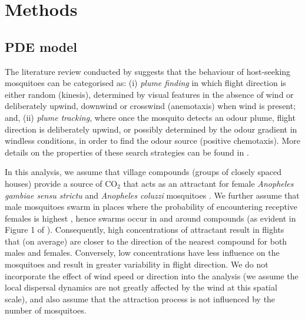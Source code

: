 \documentclass[]{bmcart}
\begin{document}
\section{Methods}

\subsection{PDE model}

The literature review conducted by \cite{Cummins2012} suggests that the behaviour of host-seeking mosquitoes can be categorised as: (i) \emph{plume finding} in which flight direction is either random (kinesis), determined by visual features in the absence of wind or deliberately upwind, downwind or crosswind (anemotaxis) when wind is present; and, (ii) \emph{plume tracking}, where once the mosquito detects an odour plume, flight direction is deliberately upwind, or possibly determined by the odour gradient in windless conditions, in order to find the odour source (positive chemotaxis). More details on the properties of these search strategies can be found in \cite{Pasternak2009}. 

In this analysis, we assume that village compounds (groups of closely spaced houses) provide a source of CO$_2$ that acts as an attractant for female \emph{Anopheles gambiae sensu strictu} and \emph{Anopheles coluzzi} mosquitoes \cite{DeJong1995, Majeed2017}. We further assume that male mosquitoes swarm in places where the probability of encountering receptive females is highest \citep{Diabate2015}, hence swarms occur in and around compounds (as evident in Figure 1 of \citep[][]{Epopa2017}). Consequently, high concentrations of attractant result in flights that (on average) are closer to the direction of the nearest compound for both males and females. Conversely, low concentrations have less influence on the mosquitoes and result in greater variability in flight direction. We do not incorporate the effect of wind speed or direction into the analysis (we assume the local dispersal dynamics are not greatly affected by the wind at this spatial scale), and also assume that the attraction process is not influenced by the number of mosquitoes.
\end{document}
